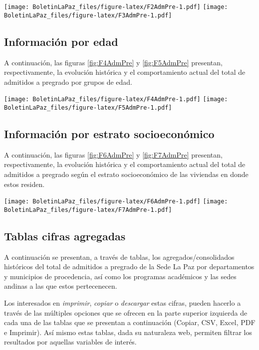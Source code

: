 \documentclass[
]{book}
\begin{document}
\texttt{[image: BoletinLaPaz\_files/figure-latex/F2AdmPre-1.pdf]}
\texttt{[image: BoletinLaPaz\_files/figure-latex/F3AdmPre-1.pdf]}

\hypertarget{informaciuxf3n-por-edad-1}{%
\subsection{Información por edad}\label{informaciuxf3n-por-edad-1}}

A continuación, las figuras \ref{fig:F4AdmPre} y \ref{fig:F5AdmPre} presentan, respectivamente, la evolución histórica y el comportamiento actual del total de admitidos a pregrado por grupos de edad.

\texttt{[image: BoletinLaPaz\_files/figure-latex/F4AdmPre-1.pdf]}
\texttt{[image: BoletinLaPaz\_files/figure-latex/F5AdmPre-1.pdf]}

\hypertarget{informaciuxf3n-por-estrato-socioeconuxf3mico-1}{%
\subsection{Información por estrato socioeconómico}\label{informaciuxf3n-por-estrato-socioeconuxf3mico-1}}

A continuación, las figuras \ref{fig:F6AdmPre} y \ref{fig:F7AdmPre} presentan, respectivamente, la evolución histórica y el comportamiento actual del total de admitidos a pregrado según el estrato socioeconómico de las viviendas en donde estos residen.

\texttt{[image: BoletinLaPaz\_files/figure-latex/F6AdmPre-1.pdf]}
\texttt{[image: BoletinLaPaz\_files/figure-latex/F7AdmPre-1.pdf]}

\hypertarget{tablas-cifras-agregadas-1}{%
\subsection{Tablas cifras agregadas}\label{tablas-cifras-agregadas-1}}

A continuación se presentan, a través de tablas, los agregados/consolidados históricos del total de admitidos a pregrado de la Sede La Paz por departamentos y municipios de procedencia, así como los programas académicos y las sedes andinas a las que estos pertecenecen.

Los interesados en \emph{imprimir}, \emph{copiar} o \emph{descargar} estas cifras, pueden hacerlo a través de las múltiples opciones que se ofrecen en la parte superior izquierda de cada una de las tablas que se presentan a continuación (Copiar, CSV, Excel, PDF e Imprimir). Así mismo estas tablas, dada su naturaleza web, permiten filtrar los resultados por aquellas variables de interés.
\end{document}
